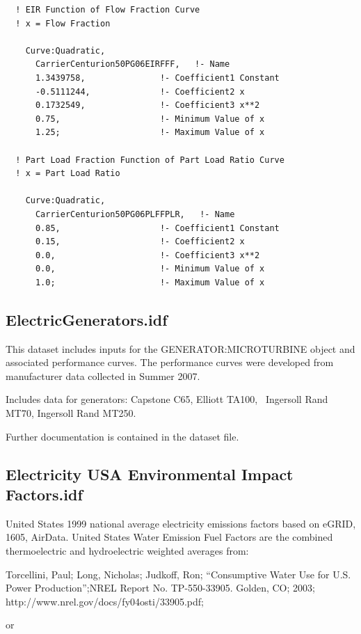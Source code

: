 \begin{lstlisting}
  ! EIR Function of Flow Fraction Curve
  ! x = Flow Fraction

    Curve:Quadratic,
      CarrierCenturion50PG06EIRFFF,   !- Name
      1.3439758,               !- Coefficient1 Constant
      -0.5111244,              !- Coefficient2 x
      0.1732549,               !- Coefficient3 x**2
      0.75,                    !- Minimum Value of x
      1.25;                    !- Maximum Value of x

  ! Part Load Fraction Function of Part Load Ratio Curve
  ! x = Part Load Ratio

    Curve:Quadratic,
      CarrierCenturion50PG06PLFFPLR,   !- Name
      0.85,                    !- Coefficient1 Constant
      0.15,                    !- Coefficient2 x
      0.0,                     !- Coefficient3 x**2
      0.0,                     !- Minimum Value of x
      1.0;                     !- Maximum Value of x
\end{lstlisting}

\subsection{ElectricGenerators.idf}\label{electricgenerators.idf}

This dataset includes inputs for the GENERATOR:MICROTURBINE object and associated performance curves. The performance curves were developed from manufacturer data collected in Summer 2007.

Includes data for generators: Capstone C65, Elliott TA100,~ Ingersoll Rand MT70, Ingersoll Rand MT250.

Further documentation is contained in the dataset file.

\subsection{Electricity USA Environmental Impact Factors.idf}\label{electricity-usa-environmental-impact-factors.idf}

United States 1999 national average electricity emissions factors based on eGRID, 1605, AirData. United States Water Emission Fuel Factors are the combined thermoelectric and hydroelectric weighted averages from:

Torcellini, Paul; Long, Nicholas; Judkoff, Ron; ``Consumptive Water Use for U.S. Power Production'';NREL Report No. TP-550-33905. Golden, CO; 2003; http://www.nrel.gov/docs/fy04osti/33905.pdf;

or

